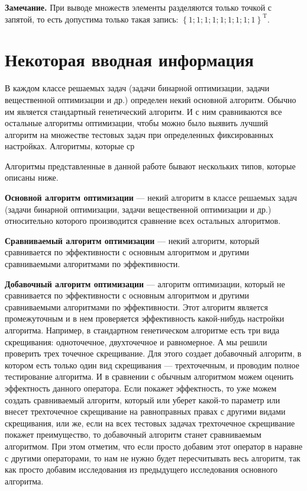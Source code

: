 \documentclass[a4paper,12pt]{article}
\begin{document}
\textbf{Замечание.} При выводе множеств элементы разделяются только точкой с запятой, то есть допустима только такая запись: $ {\left\lbrace 1;1;1;1;1;1;1;1;1 \right\rbrace }^\mathrm{T} $.

\section{Некоторая вводная информация}\label{HarrixOptimizationAlgorithms:First}

В каждом классе решаемых задач (задачи бинарной оптимизации, задачи вещественной оптимизации и др.) определен некий основной алгоритм. Обычно им является стандартный генетический алгоритм. И с ним сравниваются все остальные алгоритмы оптимизации, чтобы можно было выявить лучший алгоритм на множестве тестовых задач при определенных фиксированных настройках. Алгоритмы, которые ср

Алгоритмы представленные в данной работе бывают нескольких типов, которые описаны ниже. 

\textbf{Основной алгоритм оптимизации} --- некий алгоритм в классе решаемых задач (задачи бинарной оптимизации, задачи вещественной оптимизации и др.) относительно которого производится сравнение всех остальных алгоритмов.

\textbf{Сравниваемый алгоритм оптимизации} ---  некий алгоритм, который сравнивается по эффективности с основным алгоритмом и другими сравниваемыми алгоритмами по эффективности.

\textbf{Добавочный алгоритм оптимизации} --- алгоритм оптимизации, который не сравнивается по эффективности с основным алгоритмом и другими сравниваемыми алгоритмами по эффективности. Этот алгоритм является промежуточным и в нем проверяется эффективность какой-нибудь настройки алгоритма. Например, в стандартном генетическом алгоритме есть три вида скрещивания: одноточечное, двухточечное и равномерное. А мы решили проверить трех точечное скрещивание. Для этого создает добавочный алгоритм, в котором есть только один вид скрещивания --- трехточечным, и проводим полное тестирование алгоритма. И в сравнении с обычным алгоритмом можем оценить  эффектность данного оператора. Если покажет эффектность, то уже можем создать сравниваемый алгоритм, который или уберет какой-то параметр или внесет трехточечное скрещивание на равноправных правах с другими видами скрещивания, или же, если на всех тестовых задачах трехточечное скрещивание покажет преимущество, то добавочный алгоритм станет сравниваемым алгоритмом. При этом отметим, что если просто добавим этот оператор в наравне с другими операторами, то нам не нужно будет пересчитывать весь алгоритм, так как просто добавим исследования из предыдущего исследования основного алгоритма.
\end{document}
